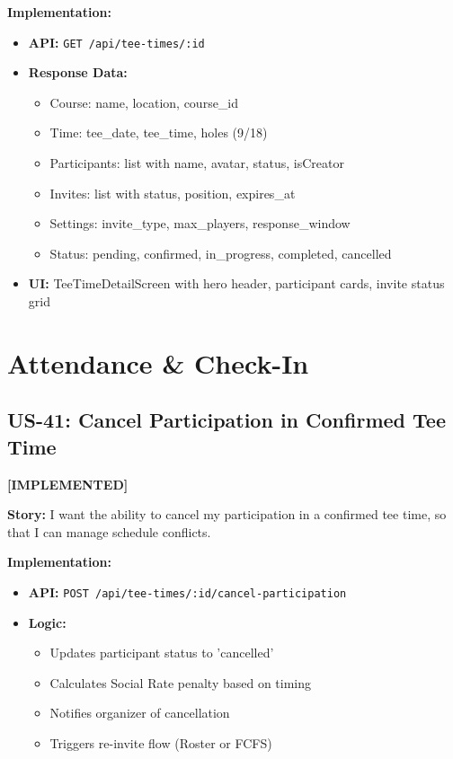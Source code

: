 \documentclass[11pt,a4paper]{article}
\newcommand{\implemented}{\textcolor{implemented}{\textbf{[IMPLEMENTED]}}}
\begin{document}
\textbf{Implementation:}
\begin{itemize}[leftmargin=*]
  \item \textbf{API:} \texttt{GET /api/tee-times/:id}
  \item \textbf{Response Data:}
    \begin{itemize}
      \item Course: name, location, course\_id
      \item Time: tee\_date, tee\_time, holes (9/18)
      \item Participants: list with name, avatar, status, isCreator
      \item Invites: list with status, position, expires\_at
      \item Settings: invite\_type, max\_players, response\_window
      \item Status: pending, confirmed, in\_progress, completed, cancelled
    \end{itemize}
  \item \textbf{UI:} TeeTimeDetailScreen with hero header, participant cards, invite status grid
\end{itemize}

\section{Attendance \& Check-In}

\subsection{US-41: Cancel Participation in Confirmed Tee Time}
\implemented

\textbf{Story:} I want the ability to cancel my participation in a confirmed tee time, so that I can manage schedule conflicts.

\textbf{Implementation:}
\begin{itemize}[leftmargin=*]
  \item \textbf{API:} \texttt{POST /api/tee-times/:id/cancel-participation}
  \item \textbf{Logic:}
    \begin{itemize}
      \item Updates participant status to 'cancelled'
      \item Calculates Social Rate penalty based on timing
      \item Notifies organizer of cancellation
      \item Triggers re-invite flow (Roster or FCFS)
    \end{itemize}
\end{itemize}
\end{document}
